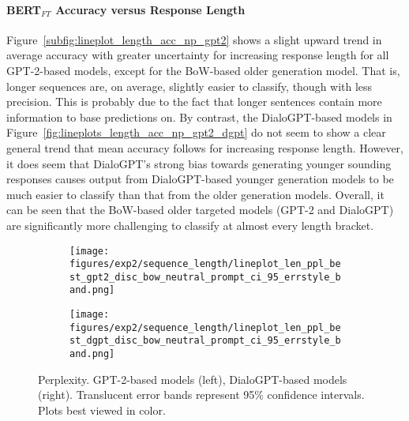 
\paragraph{BERT$_{FT}$ Accuracy versus Response Length} Figure~\ref{subfig:lineplot_length_acc_np_gpt2} shows a slight upward trend in average accuracy with greater uncertainty for increasing response length for all GPT-2-based models, except for the BoW-based older generation model. That is, longer sequences are, on average, slightly easier to classify, though with less precision. This is probably due to the fact that longer sentences contain more information to base predictions on. 
By contrast, the DialoGPT-based models in Figure~\ref{fig:lineplots_length_acc_np_gpt2_dgpt} do not seem to show a clear general trend that mean accuracy follows for increasing response length. However, it does seem that DialoGPT's strong bias towards generating younger sounding responses causes output from DialoGPT-based younger generation models to be much easier to classify than that from the older generation models. Overall, it can be seen that the BoW-based older targeted models (GPT-2 and DialoGPT) are significantly more challenging to classify at almost every length bracket.

\begin{figure}[H]
     \centering
     \begin{subfigure}[b]{0.49\textwidth}
        \centering
\texttt{[image: figures/exp2/sequence\_length/lineplot\_len\_ppl\_best\_gpt2\_disc\_bow\_neutral\_prompt\_ci\_95\_errstyle\_band.png]}
        \caption{}
        \label{subfig:lineplot_length_ppl_np_gpt2}
     \end{subfigure}
     \hfill
     \begin{subfigure}[b]{0.49\textwidth}
        \centering
        \texttt{[image: figures/exp2/sequence\_length/lineplot\_len\_ppl\_best\_dgpt\_disc\_bow\_neutral\_prompt\_ci\_95\_errstyle\_band.png]}
        \caption{}
        \label{subfig:lineplot_length_ppl_np_dgpt}
     \end{subfigure}
        \caption{Perplexity. GPT-2-based models (left), DialoGPT-based models (right). Translucent error bands represent 95\% confidence intervals. Plots best viewed in color.}
        \label{fig:lineplots_length_ppl_np_gpt2_dgpt}
\end{figure}

